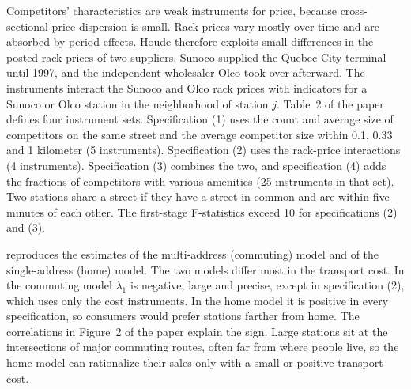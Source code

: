 Competitors' characteristics are weak instruments for price, because cross-sectional price dispersion is small. Rack
prices vary mostly over time and are absorbed by period effects. Houde therefore exploits small differences in the
posted rack prices of two suppliers. Sunoco supplied the Quebec City terminal until 1997, and the independent
wholesaler Olco took over afterward. The instruments interact the Sunoco and Olco rack prices with indicators for a
Sunoco or Olco station in the neighborhood of station $j$. Table~2 of the paper defines four instrument sets.
Specification (1) uses the count and average size of competitors on the same street and the average competitor size
within 0.1, 0.33 and 1 kilometer (5 instruments). Specification (2) uses the rack-price interactions (4
instruments). Specification (3) combines the two, and specification (4) adds the fractions of competitors with
various amenities (25 instruments in that set). Two stations share a street if they have a street in common and
are within five minutes of each other. The first-stage F-statistics exceed 10 for specifications (2) and (3).

 reproduces the estimates of the multi-address (commuting) model and of the single-address
(home) model. The two models differ most in the transport cost. In the commuting model $\lambda_1$ is negative, large
and precise, except in specification (2), which uses only the cost instruments. In the home model it is positive in
every specification, so consumers would prefer stations farther from home. The correlations in Figure~2 of the paper
explain the sign. Large stations sit at the intersections of major commuting routes, often far from where people live,
so the home model can rationalize their sales only with a small or positive transport cost.

